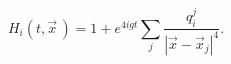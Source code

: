 \begin{equation}
H_i(t,\vec x\,)=1 + e^{4igt}\sum_j{\frac{q_i^j}{|\vec x-\vec x_j|^4}}.
\end{equation}


